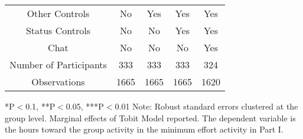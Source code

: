 \begin{table}[htbp]
\begin{tabular}{c c c c c}
\midrule
Other Controls                   &    No               &    Yes              &    Yes             &    Yes        \\
Status Controls                    &    No               &    No               &    Yes             &    Yes        \\
Chat                             &    No               &    No               &    No              &    Yes        \\
\midrule
Number of Participants           &    333               &    333              &    333             &    324        \\

\midrule
Observations                     &       1665          &       1665          &  1665              &  1620    \\
\bottomrule

\end{tabular}
\begin{footnotesize}
\newline
*P$<$0.1, **P$<$0.05, ***P$<$0.01
\newline
Note: Robust standard errors clustered at the group level. Marginal effects of Tobit Model reported.
\newline
The dependent variable is the hours toward the group activity in the minimum effort activity in Part I. \end{footnotesize}
\end{table}